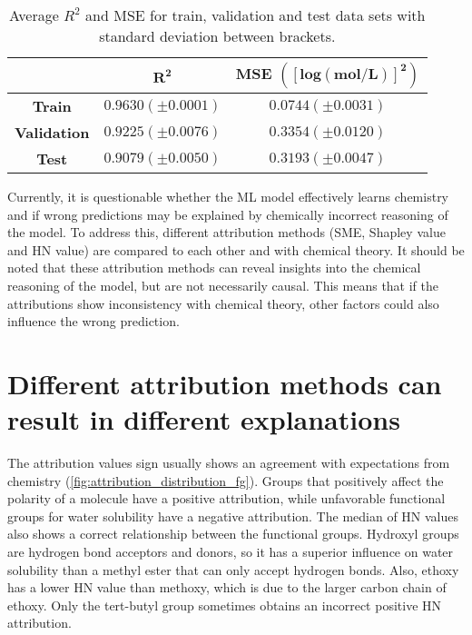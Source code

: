 \begin{table}[h]
    \centering
    \caption{Average $R^2$ and MSE for train, validation and test data sets with standard deviation between brackets.}
    \label{tab:model_performance}
    \begin{tabular}{ccc}
        \toprule 
       & $\pmb{R^2}$ & \textbf{MSE $\pmb{\left(\left[log(mol/L)\right]^2\right)}$} \\
        \midrule
        \textbf{Train} & $0.9630 (\pm 0.0001)$ & $0.0744 (\pm 0.0031)$ \\
        \textbf{Validation} & $0.9225 (\pm 0.0076)$ & $0.3354 (\pm 0.0120)$ \\
        \textbf{Test} & $0.9079 (\pm 0.0050)$ & $0.3193 (\pm 0.0047)$ \\
        \bottomrule 
    \end{tabular}
\end{table}



Currently, it is questionable whether the ML model effectively learns chemistry and 
if wrong predictions may be explained by chemically incorrect reasoning of the model. 
To address this, different attribution methods (SME, Shapley value and HN value) are 
compared to each other and with chemical theory. It should be noted that these attribution 
methods can reveal insights into the chemical reasoning of the model, but are not necessarily 
causal. This means that if the attributions show inconsistency with chemical theory, other 
factors could also influence the wrong prediction.


\section{Different attribution methods can result in different explanations}
\label{sec:results_different_explanations}


The attribution values sign usually shows an agreement with expectations from 
chemistry (\cref{fig:attribution_distribution_fg}). Groups that positively affect the polarity of a molecule have a 
positive attribution, while unfavorable functional groups for water solubility 
have a negative attribution. The median of HN values also shows a correct 
relationship between the functional groups. Hydroxyl groups are hydrogen bond 
acceptors and donors, so it has a superior influence on water solubility than 
a methyl ester that can only accept hydrogen bonds. Also, ethoxy has a lower 
HN value than methoxy, which is due to the larger carbon chain of ethoxy. Only 
the tert-butyl group sometimes obtains an incorrect positive HN attribution.


